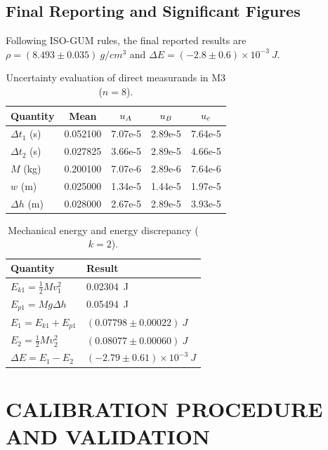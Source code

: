 \documentclass[a4paper, 12pt]{article}
\begin{document}
        \subsection{Final Reporting and Significant Figures}
        Following ISO-GUM rules, the final reported results are $\rho=(8.493\pm0.035)\ \si{g/cm^3}$ and $\Delta E=(-2.8\pm0.6)\times10^{-3}\ \si{J}$.
\begin{table}[H]
\centering
\singlespacing
\caption{Uncertainty evaluation of direct measurands in M3 ($n=8$).}
\label{tab:uM3}
\small
\begin{tabular}{l S[table-format=1.6] S[table-format=1.2e-1] S[table-format=1.2e-1] S[table-format=1.2e-1]}
\toprule
\textbf{Quantity} & {Mean} & {$u_{A}$} & {$u_{B}$} & {$u_{c}$}\\
\midrule
$\Delta t_1$ (s) & 0.052100 & 7.07e-5 & 2.89e-5 & 7.64e-5\\
$\Delta t_2$ (s) & 0.027825 & 3.66e-5 & 2.89e-5 & 4.66e-5\\
$M$ (kg) & 0.200100 & 7.07e-6 & 2.89e-6 & 7.64e-6\\
$w$ (m) & 0.025000 & 1.34e-5 & 1.44e-5 & 1.97e-5\\
$\Delta h$ (m) & 0.028000 & 2.67e-5 & 2.89e-5 & 3.93e-5\\
\bottomrule
\end{tabular}
\end{table}

\begin{table}[H]
\centering
\singlespacing
\caption{Mechanical energy and energy discrepancy ($k=2$).}
\label{tab:E}
\small
\begin{tabular}{l l}
\toprule
\textbf{Quantity} & \textbf{Result}\\
\midrule
$E_{k1}=\tfrac{1}{2}Mv_1^2$ & \SI{0.02304}{J}\\
$E_{p1}=Mg\Delta h$ & \SI{0.05494}{J}\\
$E_1=E_{k1}+E_{p1}$ & $(0.07798\pm0.00022)\ \si{J}$\\
$E_2=\tfrac{1}{2}Mv_2^2$ & $(0.08077\pm0.00060)\ \si{J}$\\
$\Delta E=E_1-E_2$ & $(-2.79\pm0.61)\times10^{-3}\ \si{J}$\\
\bottomrule
\end{tabular}
\end{table}

\section{CALIBRATION PROCEDURE AND VALIDATION}
\end{document}
